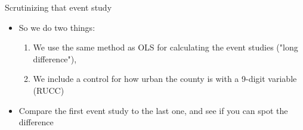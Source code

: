 \documentclass{beamer}
\begin{document}
\begin{frame}{Scrutinizing that event study}

\begin{itemize}
\item So we do two things: 
	\begin{enumerate}
	\item We use the same method as OLS for calculating the event studies ("long difference"), 
	\item We include a control for how urban the county is with a 9-digit variable (RUCC)
	\end{enumerate}
\item Compare the first event study to the last one, and see if you can spot the difference 
\end{itemize}
\end{frame}
\end{document}
